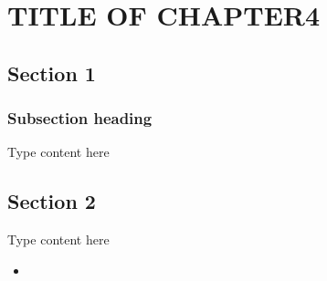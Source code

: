 \chapter{TITLE OF CHAPTER4}
\graphicspath{{Chapter4/}}

\section{Section 1}
\subsection{Subsection heading}
Type content here
\section{Section 2}
Type content here
\begin{itemize}
	\item 
\end{itemize}